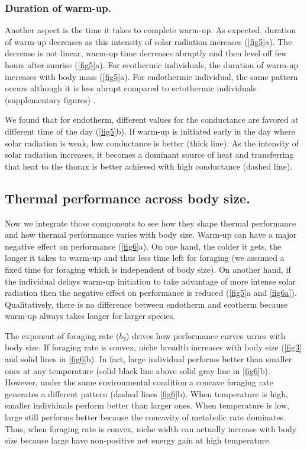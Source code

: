 \subsubsection*{Duration of warm-up.}
Another aspect is the time it takes to complete warm-up.
As expected, duration of warm-up decreases as this intensity of solar radiation increases (\cref{fig5}a).
The decrease is not linear, warm-up time decreases abruptly and then level off few hours after sunrise (\cref{fig5}a).
For ecothermic individuals, the duration of warm-up increases with body mass (\cref{fig5}a).
For endothermic individual, the same pattern occurs although it is less abrupt compared to ectothermic individuals (supplementary figures) .

We found that for endotherm, different values for the conductance are favored at different time of the day (\cref{fig5}b).
If warm-up is initiated early in the day where solar radiation is weak, low conductance is better (thick line).
As the intensity of solar radiation increases, it becomes a dominant source of heat and transferring that heat to the thorax is better achieved with high conductance (dashed line).

\subsection*{Thermal performance across body size.}
Now we integrate those components to see how they shape thermal performance and how thermal performance varies with body size.
Warm-up can have a major negative effect on performance (\cref{fig6}a).
On one hand, the colder it gets, the longer it takes to warm-up and thus less time left for foraging (we assumed a fixed time for foraging which is independent of body size).
On another hand, if the individual delays warm-up initiation to take advantage of more intense solar radiation then the negative effect on performance is reduced (\cref{fig5}a and \cref{fig6a}).
Qualitatively, there is no difference between endotherm and ecotherm because warm-up always takes longer for larger species. 

The exponent of foraging rate ($b_3$) drives how performance curves varies with body size.
If foraging rate is convex, niche breadth increases with body size (\cref{fig3} and solid lines in \cref{fig6}b).
In fact, large individual performs better than smaller ones at any temperature (solid black line above solid gray line in \cref{fig6}b).
However, under the same environmental condition a concave foraging rate generates a different pattern (dashed lines \cref{fig6}b).
When temperature is high, smaller individuals perform better than larger ones.
When temperature  is low,  large still performs better because the concavity of metabolic rate dominates.
Thus, when foraging rate is convex, niche width can actually increase with body size because large have non-positive net energy gain at high temperature. 
   

